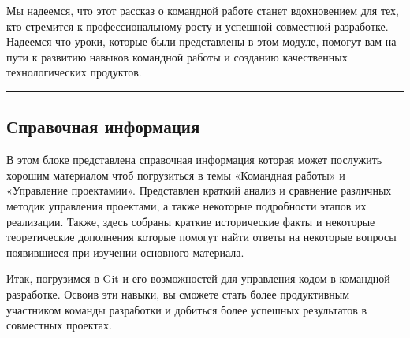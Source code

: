 \documentclass[letterpaper,10pt,russian]{sphinxmanual}
\begin{document}
\sphinxAtStartPar
Мы надеемся, что этот рассказ о командной работе станет вдохновением для тех, кто стремится к профессиональному росту и успешной совместной разработке. Надеемся что уроки, которые были представлены в этом модуле, помогут вам на пути к развитию навыков командной работы и созданию качественных технологических продуктов.


\bigskip\hrule\bigskip



\subsection{Справочная информация}
\label{\detokenize{educational_materials/team_work_on_a_gitflic/content:id3}}
\sphinxAtStartPar
В этом блоке представлена справочная информация которая может послужить хорошим материалом чтоб погрузиться в темы «Командная работы» и «Управление проектамии». Представлен краткий анализ и сравнение различных методик управления проектами, а также некоторые подробности этапов их реализации. Также, здесь собраны краткие исторические факты и некоторые теоретические дополнения которые помогут найти ответы на некоторые вопросы появившиеся при изучении основного материала.

\sphinxAtStartPar
Итак, погрузимся в Git и его возможностей для управления кодом в командной разработке. Освоив эти навыки, вы сможете стать более продуктивным участником команды разработки и добиться более успешных результатов в совместных проектах.
\end{document}
